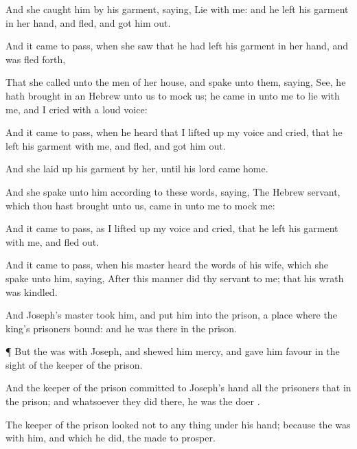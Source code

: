 {And she
caught him by his
garment,
saying,
Lie with me: and he
left his
garment in her
hand, and
fled, and
got him
out.


\par }{\PP {}And it came to pass, when she
saw that he had
left his
garment in her
hand, and was
fled
forth,

That she
called unto the
men of her
house, and
spake unto them,
saying,
See, he hath brought
in an
Hebrew unto us to
mock us; he came
in unto me to
lie with me, and I
cried with a
loud
voice:

And it came to pass, when he
heard that I lifted
up my
voice and
cried, that he
left his
garment with
me, and
fled, and got
him
out.

And she laid
up his
garment by
her, until his
lord
came
home.

And she
spake unto him according to these
words,
saying, The
Hebrew
servant, which thou hast
brought unto us, came
in unto me to
mock me:

And it came to pass, as I lifted
up my
voice and
cried, that he
left his
garment with
me, and
fled
out.


\par }{\PP {}And it came to pass, when his
master
heard the
words of his
wife, which she
spake unto him,
saying, After this
manner
did thy
servant to me; that his
wrath was
kindled.

And
Joseph’s
master
took him, and put
him into the
prison, a
place where the
king’s
prisoners
{}
bound: and he was there in the
prison.


\par }{\PP {}¶ But the
{} was with
Joseph, and
shewed him
mercy, and
gave him
favour in the
sight of the
keeper of the
prison.

And the
keeper of the
prison
committed to
Joseph’s
hand all the
prisoners that
{} in the
prison; and whatsoever they
did there, he was the
doer
{}.

The
keeper of the
prison
looked not to any
thing
{} under his
hand; because the
{} was with him, and
{} which he
did, the
{} made
{} to
prosper.




\par }
